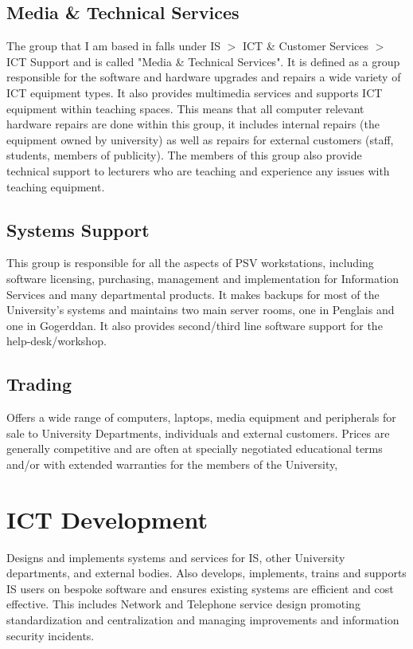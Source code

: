 \documentclass[10pt,a4paper,headinclude=true]{report}
\begin{document}
\subsection{Media \& Technical Services}
The group that I am based in falls under IS $>$ ICT \& Customer Services $>$ ICT Support and is called "Media \& Technical Services". It is defined as a group responsible for the software and hardware upgrades and repairs a wide variety of ICT equipment types. It also provides multimedia services and supports ICT equipment within teaching spaces. This means that all computer relevant hardware repairs are done within this group, it includes internal repairs (the equipment owned by university) as well as repairs for external customers (staff, students, members of publicity). The members of this group also provide technical support to lecturers who are teaching and experience any issues with teaching equipment.

\subsection{Systems Support}
This group is responsible for all the aspects of PSV workstations, including software licensing, purchasing, management and implementation for Information Services and many departmental products. It makes backups for most of the University's systems and maintains two main server rooms, one in Penglais and one in Gogerddan. It also provides second/third line software support for the help-desk/workshop.
\subsection{Trading}
Offers a wide range of computers, laptops, media equipment and peripherals for sale to University Departments, individuals and external customers. Prices are generally competitive and are often at specially negotiated educational terms and/or with extended warranties for the members of the University,
\section{ICT Development}
Designs and implements systems and services for IS, other University departments, and external bodies. Also develops, implements, trains and supports IS users on bespoke software and ensures existing systems are efficient and cost effective. This includes Network and Telephone service design promoting standardization and centralization and managing improvements and information security incidents.
\end{document}
